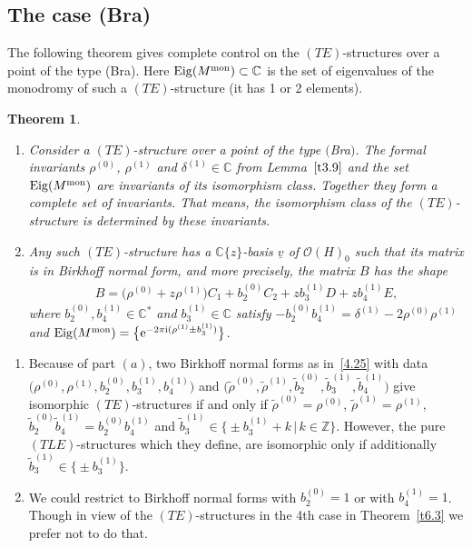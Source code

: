 \documentclass[pdftex]{sigma}%
\numberwithin{equation}{section}
\numberwithin{figure}{section}
\newcommand{\Z}{{\mathbb Z}}
\newcommand{\C}{{\mathbb C}}
\newcommand{\OO}{{\mathcal O}}
\newcommand{\www}{\widetilde}
\newcommand{\uuuu}{\underline}
\DeclareMathOperator{\Eig}{Eig}
\newtheorem{Theorem}{Theorem}[section]
\begin{document}
\subsection{The case (Bra)}%


The following theorem gives complete control on the
$(TE)$-structures over a point of the type (Bra).
Here $\Eig(M^{\rm mon})\subset\C$ is the set of eigenvalues
of the monodromy of such a $(TE)$-structure
(it has 1 or 2 elements).

\begin{Theorem}\label{t4.11}\quad

\begin{enumerate}\itemsep=0pt
\item[$(a)$] Consider a $(TE)$-structure over a point of the type $($Bra$)$.
The formal invariants $\rho^{(0)}$, $\rho^{(1)}$ and
$\delta^{(1)}\in\C$ from Lemma~$\ref{t3.9}$ and the
set $\Eig(M^{\rm mon})$
are invariants of its isomorphism class.
Together they form a complete set of invariants.
That means, the isomorphism class of the $(TE)$-structure
is determined by these invariants.

\item[$(b)$] Any such $(TE)$-structure has a $\C\{z\}$-basis
$\uuuu{v}$ of $\OO(H)_0$ such that its matrix is
in Birkhoff normal form, and more precisely, the matrix
$B$ has the shape
\begin{gather}\label{4.25}
B= \big(\rho^{(0)}+z\rho^{(1)}\big)C_1 + b_2^{(0)}C_2 + zb_3^{(1)}D+ zb_4^{(1)}E,
\end{gather}
where $b_2^{(0)},b_4^{(1)}\in\C^*$ and $b_3^{(1)}\in\C$ satisfy
$-b_2^{(0)}b_4^{(1)}=\delta^{(1)}-2\rho^{(0)}\rho^{(1)}$ and
$\Eig(M^{\rm mon})=\big\{{\rm e}^{-2\pi {\rm i} (\rho^{(1)}\pm b_3^{(1)})}\big\}$.
\end{enumerate}
\end{Theorem}


\begin{Remarks}\label{t4.12}\quad
\begin{enumerate}\itemsep=0pt
\item[$(i)$] Because of part $(a)$, two Birkhoff normal forms as in~\eqref{4.25}
with data $\big(\rho^{(0)},\rho^{(1)},b_2^{(0)},\allowbreak b_3^{(1)},b_4^{(1)}\big)$
and $\big(\www\rho^{(0)},\www\rho^{(1)},\www b_2^{(0)},\www b_3^{(1)}, \www b_4^{(1)}\big)$
give isomorphic $(TE)$-structures
if and only if $\www \rho^{(0)}=\rho^{(0)}$,
$\www\rho^{(1)}=\rho^{(1)}$,
$\www b_2^{(0)}\www b_4^{(1)}=b_2^{(0)} b_4^{(1)}$
and $\www b_3^{(1)}\in \big\{{\pm} b_3^{(1)}+k\,|\, k\in\Z\big\}$.
However, the pure $(TLE)$-structures which they
define, are isomorphic only if additionally
$\www b_3^{(1)}\in\big\{{\pm} b_3^{(1)}\big\}$.

\item[$(ii)$] We could restrict to Birkhoff normal forms with
$b_2^{(0)}=1$ or with $b_4^{(1)}=1$. Though in view of the
$(TE)$-structures in the 4th case in Theorem~\ref{t6.3}
we prefer not to do that.
\end{enumerate}
\end{Remarks}
\end{document}
